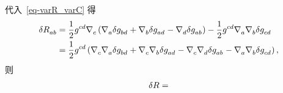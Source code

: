 \begin{Proof}
			代入~\eqref{eq-varR_varC} 得
			\begin{equation}
				\begin{split}
					\var{\tensor{R}{_a_b}} &= \frac{1}{2} \tensor{g}{^c^d} \Nabla{c} \left( \Nabla{a} \var \tensor{g}{_b_d} + \Nabla{b} \var \tensor{g}{_a_d} - \Nabla{d} \var \tensor{g}{_a_b} \right) - \frac{1}{2} \tensor{g}{^c^d} \Nabla{a} \Nabla{b} \var \tensor{g}{_c_d}\\
					&= \frac{1}{2} \tensor{g}{^c^d} \left( \Nabla{c} \Nabla{a} \var \tensor{g}{_b_d} + \Nabla{c} \Nabla{b} \var \tensor{g}{_a_d} - \Nabla{c} \Nabla{d} \var \tensor{g}{_a_b} - \Nabla{a} \Nabla{b} \var \tensor{g}{_c_d} \right),
				\end{split}
			\end{equation}
			则
			\begin{equation}
				\begin{split}
					\var{R} = 
				\end{split}
			\end{equation}
		\end{Proof}
